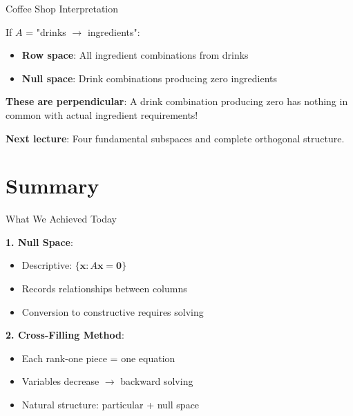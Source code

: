 \documentclass[10pt]{beamer}
\theoremstyle{definition}
\newcommand{\x}[1]{\alert{\textbf{#1}}}
\begin{document}
\begin{frame}{Coffee Shop Interpretation}

If $A$ = "drinks $\to$ ingredients":

\begin{itemize}
\item \textbf{Row space}: All ingredient combinations from drinks
\item \textbf{Null space}: Drink combinations producing zero ingredients
\end{itemize}

\vspace{1em}

\x{These are perpendicular}: A drink combination producing zero has nothing in common with actual ingredient requirements!

\vspace{1em}

\x{Next lecture}: Four fundamental subspaces and complete orthogonal structure.

\end{frame}

\section{Summary}

\begin{frame}{What We Achieved Today}

\x{1. Null Space}:
\begin{itemize}
\item Descriptive: $\{\mathbf{x} : A\mathbf{x} = \mathbf{0}\}$
\item Records relationships between columns
\item Conversion to constructive requires solving
\end{itemize}

\vspace{0.5em}

\x{2. Cross-Filling Method}:
\begin{itemize}
\item Each rank-one piece = one equation
\item Variables decrease $\to$ backward solving
\item Natural structure: particular + null space
\end{itemize}

\end{frame}
\end{document}
